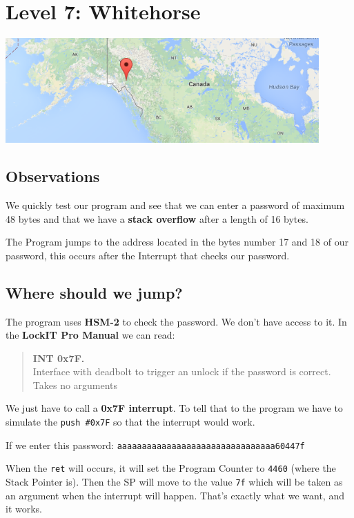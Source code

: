 \documentclass[a4paper,11pt]{article}
\begin{document}
\section{Level 7: Whitehorse}\label{level-7-whitehorse}

\includegraphics{img/7_1.PNG}

\subsection{Observations}\label{observations-3}

We quickly test our program and see that we can enter a password of
maximum 48 bytes and that we have a \textbf{stack overflow} after a
length of 16 bytes.

The Program jumps to the address located in the bytes number 17 and 18
of our password, this occurs after the Interrupt that checks our
password.

\subsection{Where should we jump?}\label{where-should-we-jump}

The program uses \textbf{HSM-2} to check the password. We don't have
access to it. In the \textbf{LockIT Pro Manual} we can read:

\begin{quote}
\textbf{INT 0x7F.}\\Interface with deadbolt to trigger an unlock if the
password is correct.\\Takes no arguments
\end{quote}

We just have to call a \textbf{0x7F interrupt}. To tell that to the
program we have to simulate the \texttt{push \#0x7F} so that the
interrupt would work.

If we enter this password:
\texttt{aaaaaaaaaaaaaaaaaaaaaaaaaaaaaaaa60447f}

When the \texttt{ret} will occurs, it will set the Program Counter to
\texttt{4460} (where the Stack Pointer is). Then the SP will move to the
value \texttt{7f} which will be taken as an argument when the interrupt
will happen. That's exactly what we want, and it works.
\end{document}
